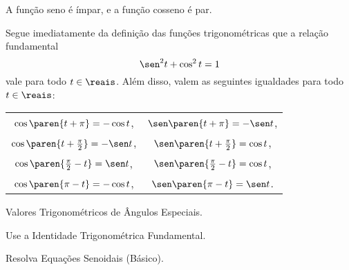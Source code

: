  \begin{proposition}
     A função seno é ímpar, e a função cosseno é par.
 \end{proposition}

 Segue imediatamente da definição das funções trigonométricas que a
relação fundamental $$ \sen^2 t + \cos^2 t = 1$$ vale para todo $t
\in \reais$.
Além disso, valem as seguintes igualdades para todo $t \in \reais$:
\begin{center}
\begin{tabular}{ c c }
    $\cos \paren{t+ \pi} = -\cos t$, & $\sen \paren{t+ \pi} = -\sen t$, \\
    $\cos \paren{t+ \frac {\pi} 2} = -\sen t$, & $\sen \paren{t+ \frac {\pi} 2} = \cos t$, \\
    $\cos \paren{ \frac {\pi} 2 -t} = \sen t$, & $\sen \paren{ \frac {\pi} 2 -t} = \cos t$, \\
    $\cos \paren{ \pi -t} = -\cos t$, & $\sen \paren{ \pi -t} = \sen t$. \\
  \end{tabular}
\end{center}

\begin{onlineact}
    {Valores Trigonométricos de Ângulos Especiais}.
\end{onlineact}

\begin{onlineact}
    {Use a Identidade Trigonométrica Fundamental}.
\end{onlineact}

\begin{onlineact}
    {Resolva Equações Senoidais (Básico)}.
\end{onlineact}
